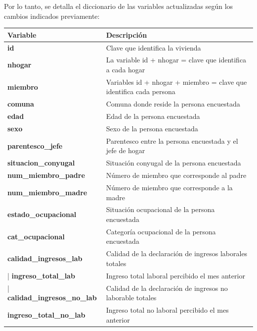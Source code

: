 \documentclass[a4paper]{article}
\begin{document}
    Por lo tanto, se detalla el diccionario de las variables actualizadas según los cambios indicados previamente:
    \begin{table}[H]
    \begin{tabular}{ll}
        \toprule
        \textbf{Variable}                     & \textbf{Descripción} \\ \midrule
        \textbf{id}                            & Clave que identifica la vivienda \\                            
        \textbf{nhogar}                        & La variable id + nhogar = clave que identifica a cada hogar \\ 
        \textbf{miembro}                       & Variables id + nhogar + miembro = clave que identifica  cada persona \\ 
        \textbf{comuna}                        & Comuna donde reside la persona encuestada \\ 
        \textbf{edad}                          & Edad de la persona encuestada \\             
        \textbf{sexo}                          & Sexo de la persona encuestada \\             
        \textbf{parentesco\_jefe}              & Parentesco entre la persona encuestada y el jefe de hogar \\ 
        \textbf{situacion\_conyugal}           & Situación conyugal de la persona encuestada \\               
        \textbf{num\_miembro\_padre}           & Número de miembro que corresponde al padre \\                
        \textbf{num\_miembro\_madre}           & Número de miembro que corresponde a la madre \\   
        \textbf{estado\_ocupacional}           & Situación ocupacional de la persona encuestada \\ 
        \textbf{cat\_ocupacional}              & Categoría ocupacional de la persona encuestada \\ 
        \textbf{calidad\_ingresos\_lab}        & Calidad de la declaración de ingresos laborales totales \\ |
        \textbf{ingreso\_total\_lab}           & Ingreso total laboral percibido el mes anterior \\         |
        \textbf{calidad\_ingresos\_no\_lab}    & Calidad de la declaración de ingresos no laborable totales \\
        \textbf{ingreso\_total\_no\_lab}       & Ingreso total no laboral percibido el mes anterior \\ 

\end{tabular}
\end{table}
\end{document}
